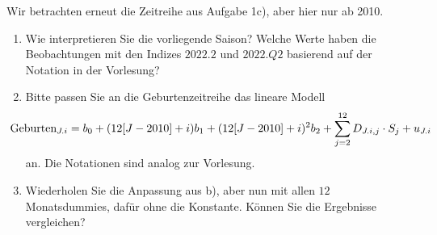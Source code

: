 Wir betrachten erneut die Zeitreihe aus Aufgabe 1c), aber hier nur ab 2010.

\begin{enumerate}

\item Wie interpretieren Sie die vorliegende Saison? Welche Werte haben die Beobachtungen mit den Indizes $2022.2$ und $2022.Q2$ basierend auf der Notation in der Vorlesung?


\item Bitte passen Sie an die Geburtenzeitreihe das lineare Modell
\begin{align*}
\hspace{-0.5cm}
\text{Geburten}_{J.i} = b_0 + (12[J - 2010] + i)b_1 + (12[J - 2010] + i)^2b_2 + \sum_{j = 2}^{12} D_{J.i,j} \cdot S_j + u_{J.i}
\end{align*}
an. Die Notationen sind analog zur Vorlesung.


\item Wiederholen Sie die Anpassung aus b), aber nun mit allen $12$ Monatsdummies, dafür ohne die Konstante. Können Sie die Ergebnisse vergleichen?


\end{enumerate}


